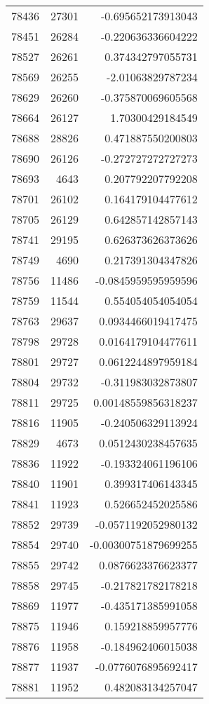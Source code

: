 \begin{tabular}{r | r | r}
78436 & 27301 & -0.695652173913043 \\
78451 & 26284 & -0.220636336604222 \\
78527 & 26261 & 0.374342797055731 \\
78569 & 26255 & -2.01063829787234 \\
78629 & 26260 & -0.375870069605568 \\
78664 & 26127 & 1.70300429184549 \\
78688 & 28826 & 0.471887550200803 \\
78690 & 26126 & -0.272727272727273 \\
78693 & 4643 & 0.207792207792208 \\
78701 & 26102 & 0.164179104477612 \\
78705 & 26129 & 0.642857142857143 \\
78741 & 29195 & 0.626373626373626 \\
78749 & 4690 & 0.217391304347826 \\
78756 & 11486 & -0.0845959595959596 \\
78759 & 11544 & 0.554054054054054 \\
78763 & 29637 & 0.0934466019417475 \\
78798 & 29728 & 0.0164179104477611 \\
78801 & 29727 & 0.0612244897959184 \\
78804 & 29732 & -0.311983032873807 \\
78811 & 29725 & 0.00148559856318237 \\
78816 & 11905 & -0.240506329113924 \\
78829 & 4673 & 0.0512430238457635 \\
78836 & 11922 & -0.193324061196106 \\
78840 & 11901 & 0.399317406143345 \\
78841 & 11923 & 0.526652452025586 \\
78852 & 29739 & -0.0571192052980132 \\
78854 & 29740 & -0.00300751879699255 \\
78855 & 29742 & 0.0876623376623377 \\
78858 & 29745 & -0.217821782178218 \\
78869 & 11977 & -0.435171385991058 \\
78875 & 11946 & 0.159218859957776 \\
78876 & 11958 & -0.184962406015038 \\
78877 & 11937 & -0.0776076895692417 \\
78881 & 11952 & 0.482083134257047 \\

\end{tabular}
